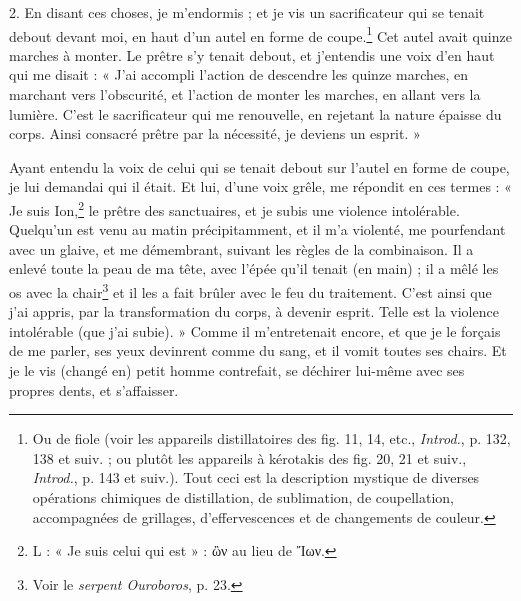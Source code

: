 \documentclass[a4paper, 11pt, oneside, polutonikogreek, french]{article}
\begin{document}
2. En disant ces choses, je m'endormis ; et je vis un sacrificateur qui se tenait debout devant moi, en haut d'un autel en forme de coupe.\footnote{Ou de fiole (voir les appareils distillatoires des fig. 11, 14, etc., \emph{Introd.}, p. 132, 138 et suiv. ; ou plutôt les appareils à kérotakis des fig. 20, 21 et suiv., \emph{Introd.}, p. 143 et suiv.). Tout ceci est la description mystique de diverses opérations chimiques de distillation, de sublimation, de coupellation, accompagnées de grillages, d'effervescences et de changements de couleur.} Cet autel avait quinze marches à monter. Le prêtre s'y tenait debout, et j'entendis une voix d'en haut qui me disait : « J'ai accompli l'action de descendre les quinze marches, en marchant vers l'obscurité, et l'action de monter les marches, en allant vers la lumière. C'est le sacrificateur qui me renouvelle, en rejetant la nature épaisse du corps. Ainsi consacré prêtre par la nécessité, je deviens un esprit. »

Ayant entendu la voix de celui qui se tenait debout sur l'autel en forme de coupe, je lui demandai qui il était. Et lui, d'une voix grêle, me répondit en ces termes : « Je suis Ion,\footnote{L : « Je suis celui qui est » : ὢν au lieu de Ἴων.} le prêtre des sanctuaires, et je subis une violence intolérable. Quelqu'un est venu au matin précipitamment, et il m'a violenté, me pourfendant avec un glaive, et me démembrant, suivant les règles de la combinaison. Il a enlevé toute la peau de ma tête, avec l'épée qu'il tenait (en main) ; il a mêlé les os avec la chair\footnote{Voir le \emph{serpent Ouroboros}, p. 23.} et il les a fait brûler avec le feu du traitement. C'est ainsi que j'ai appris, par la transformation du corps, à devenir esprit. Telle est la violence intolérable (que j'ai subie). » Comme il m'entretenait encore, et que je le forçais de me parler, ses yeux devinrent comme du sang, et il vomit toutes ses chairs. Et je le vis (changé en) petit homme contrefait, se déchirer lui-même avec ses propres dents, et s'affaisser.
\end{document}
